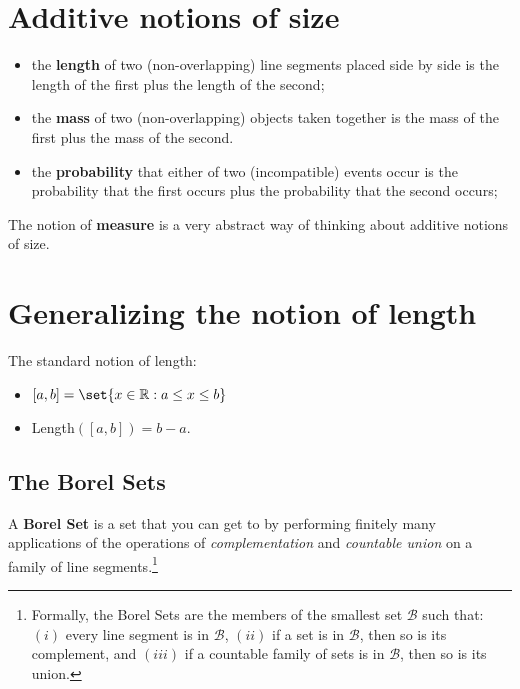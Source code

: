 \documentclass[12pt]{extarticle}
\begin{document}



\section{Additive notions of size}


\begin{itemize}

\item the \textbf{length} of two (non-overlapping) line segments placed side by side is the length of the first plus the length of the second; 

\item the \textbf{mass} of two (non-overlapping) objects taken together is the mass of the first plus the mass of the second. 

\item the \textbf{probability} that either of two (incompatible) events occur is the probability that the first occurs plus the probability that the second occurs; 

\end{itemize}
The notion of \textbf{measure} is a very abstract way of thinking about additive notions of size.


\section{Generalizing the notion of length}


The standard notion of length:
\begin{itemize}
\item $[a,b] = \set{x \in \mathbb{R} : a \leq x \leq b}$

\item Length$\left([a,b]\right) = b - a$.
\end{itemize}



\subsection{The Borel Sets}
\label{sec:borel-sets}

A \textbf{Borel Set} is a set that you can get to by performing finitely many applications of the operations of \emph{complementation} and \emph{countable union} on a family of line segments.\footnote{Formally, the Borel Sets are the members of the smallest set $\mathscr{B}$ such that: $(i)$ every line segment is in $\mathscr{B}$, $(ii)$ if a set is in $\mathscr{B}$, then so is its complement, and $(iii)$ if a countable family of sets is in $\mathscr{B}$, then so is its union.}
\end{document}
